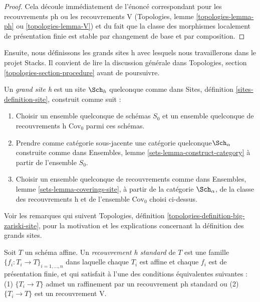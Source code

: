 \begin{proof}
Cela découle immédiatement de l'énoncé correspondant pour
les recouvrements ph ou les recouvrements V
(Topologies, lemme \ref{topologies-lemma-ph} ou
\ref{topologies-lemma-V})
et du fait que la classe des morphismes localement
de présentation finie est stable par changement de base et par
composition.
\end{proof}

\noindent
Ensuite, nous définissons les grands sites h avec lesquels nous travaillerons dans le
projet Stacks. Il convient de lire la discussion générale
dans Topologies, section \ref{topologies-section-procedure}
avant de poursuivre.

\begin{definition}
\label{definition-big-h-site}
Un {\it grand site h} est un site $\Sch_h$ quelconque comme dans
Sites, définition \ref{sites-definition-site}, construit comme suit :
\begin{enumerate}
\item Choisir un ensemble quelconque de schémas $S_0$ et un ensemble quelconque de recouvrements h
$\text{Cov}_0$ parmi ces schémas.
\item Prendre comme catégorie sous-jacente une catégorie quelconque\newline $\Sch_\alpha$
construite comme dans Ensembles, lemme \ref{sets-lemma-construct-category}
à partir de l'ensemble $S_0$.
\item Choisir un ensemble quelconque de recouvrements comme dans
Ensembles, lemme \ref{sets-lemma-coverings-site}, à partir de la
catégorie $\Sch_\alpha$, de la classe des recouvrements h
et de l'ensemble $\text{Cov}_0$ choisi ci-dessus.
\end{enumerate}
\end{definition}

\noindent
Voir les remarques qui suivent
Topologies, définition \ref{topologies-definition-big-zariski-site},
pour la motivation et les explications concernant la définition des grands sites.

\begin{definition}
\label{definition-standard-h}
Soit $T$ un schéma affine. Un {\it recouvrement h standard} de $T$
est une famille $\{f_i : T_i \to T\}_{i = 1, \ldots, n}$ dans laquelle chaque $T_i$ est
affine et chaque $f_i$ est de présentation finie, et qui satisfait à l'une des
conditions équivalentes suivantes : (1) $\{T_i \to T\}$ admet un raffinement par
un recouvrement ph standard ou (2) $\{T_i \to T\}$ est un recouvrement V.
\end{definition}

